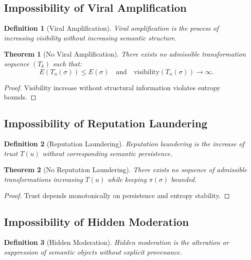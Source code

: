 \documentclass[11pt]{article}
\newtheorem{definition}{Definition}
\newtheorem{theorem}{Theorem}
\begin{document}
\subsection{Impossibility of Viral Amplification}

\begin{definition}[Viral Amplification]
Viral amplification is the process of increasing visibility without increasing semantic
structure.
\end{definition}

\begin{theorem}[No Viral Amplification]
There exists no admissible transformation sequence $(T_k)$ such that:
\[
E(T_n(\sigma)) \le E(\sigma)
\quad \text{and} \quad
\text{visibility}(T_n(\sigma)) \to \infty.
\]
\end{theorem}

\begin{proof}
Visibility increase without structural information violates entropy bounds.
\end{proof}

\subsection{Impossibility of Reputation Laundering}

\begin{definition}[Reputation Laundering]
Reputation laundering is the increase of trust $T(u)$ without corresponding semantic
persistence.
\end{definition}

\begin{theorem}[No Reputation Laundering]
There exists no sequence of admissible transformations increasing $T(u)$ while keeping
$\pi(\sigma)$ bounded.
\end{theorem}

\begin{proof}
Trust depends monotonically on persistence and entropy stability.
\end{proof}

\subsection{Impossibility of Hidden Moderation}

\begin{definition}[Hidden Moderation]
Hidden moderation is the alteration or suppression of semantic objects without explicit
provenance.
\end{definition}
\end{document}
